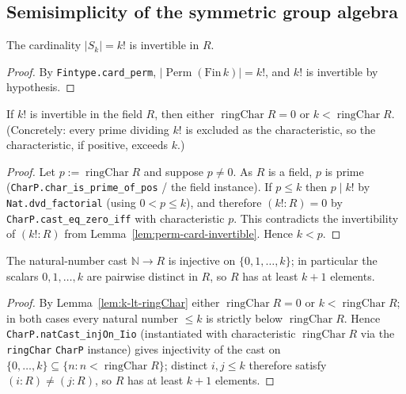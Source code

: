 \subsection{Semisimplicity of the symmetric group algebra}

\begin{lemma}
    \label{lem:perm-card-invertible}
    \leanok
    The cardinality $|S_k| = k!$ is invertible in $R$.
\end{lemma}
\begin{proof}
    By \texttt{Fintype.card\_perm}, $|\operatorname{Perm}(\mathrm{Fin}\,k)| = k!$, and $k!$ is
    invertible by hypothesis.
\end{proof}

\begin{lemma}
    \label{lem:k-lt-ringChar}
    If $k!$ is invertible in the field $R$, then either $\operatorname{ringChar} R = 0$ or
    $k < \operatorname{ringChar} R$. (Concretely: every prime dividing $k!$ is excluded as the
    characteristic, so the characteristic, if positive, exceeds $k$.)
\end{lemma}
\begin{proof}
    Let $p := \operatorname{ringChar} R$ and suppose $p \ne 0$. As $R$ is a field, $p$ is prime
    (\texttt{CharP.char\_is\_prime\_of\_pos} / the field instance). If $p \le k$ then $p \mid k!$ by
    \texttt{Nat.dvd\_factorial} (using $0 < p \le k$), and therefore $(k! : R) = 0$ by
    \texttt{CharP.cast\_eq\_zero\_iff} with characteristic $p$. This contradicts the invertibility of
    $(k! : R)$ from Lemma~\ref{lem:perm-card-invertible}. Hence $k < p$.
\end{proof}

\begin{lemma}
    \label{lem:cast-distinct}
    \leanok
    The natural-number cast $\mathbb{N} \to R$ is injective on $\{0, 1, \ldots, k\}$; in particular
    the scalars $0, 1, \ldots, k$ are pairwise distinct in $R$, so $R$ has at least $k+1$ elements.
\end{lemma}
\begin{proof}
    By Lemma~\ref{lem:k-lt-ringChar} either $\operatorname{ringChar} R = 0$ or $k < \operatorname{ringChar} R$;
    in both cases every natural number $\le k$ is strictly below $\operatorname{ringChar} R$. Hence
    \texttt{CharP.natCast\_injOn\_Iio} (instantiated with characteristic $\operatorname{ringChar} R$ via
    the \texttt{ringChar} \texttt{CharP} instance) gives injectivity of the cast on
    $\{0, \ldots, k\} \subseteq \{n : n < \operatorname{ringChar} R\}$; distinct $i, j \le k$ therefore
    satisfy $(i : R) \ne (j : R)$, so $R$ has at least $k+1$ elements.
\end{proof}

